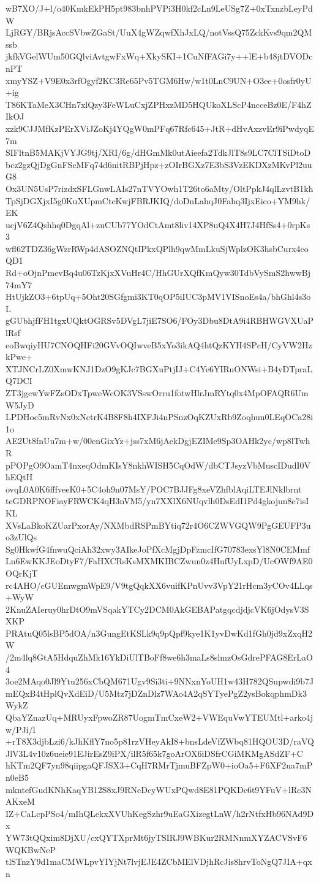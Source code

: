 wB7XO/J+l/o40KmkEkPH5pt983bnhPVPi3H0kf2cLn9LeUSg7Z+0xTxnzbLeyPdW
LjRGY/BRjsAccSVbwZGaSt/UuX4gWZqwfXhJxLQ/notVssQ75ZckKvs9qm2QMssb
jkfkVGelWUm50GQlviAvtgwFxWq+XkySKI+1CuNfFAGi7y++lE+b48jtDVODcnPT
xmyYSZ+V9E0x3rfOgyf2KC3Re65Pv5TGM6Hw/w1t0LnC9UN+O3ee+0osfr0yU+ig
T86KTaMeX3CHn7xlQzy3FeWLuCxjZPHxzMD5HQUkoXLScP4ncceBz0E/F4hZIkOJ
xzk9CJJMfKzPErXViJZoKj4YQgW0mPFq67Rfc645+JtR+dHvAxzvEr9iPwdyqE7m
SIFltnB5MAKjVYJG9tj/XRI/6g/dHGmMk0utAieefa2TdkJlT8s9LC7ClTSiDtoD
bcz2gzQjDgGnFScMFq74d6nitRBPjHpz+zOIrBGXz7E3bS3VzEKDXzMKvPl2uuG8
Ox3UN5UsP7rizdxSFLGnwLAIs27nTVYOwh1T26to6aMty/OltPpkJ4qlLzvtB1kh
TpSjDGXjxI5g0KuXUpmCtcKwjFBRJKIQ/doDnLahqJ0Fahq3IjxEico+YM9hk/EK
ucjV6Z4Qshhq0DgqAl+zuCUb77YOdCtAmt8liv14XP8uQ4X4H7J4HfSs4+0rpKs3
wfl62TDZ36gWzrRWp4dASOZNQtIPkxQPlh9qwMmLkuSjWplzOK3hsbCurx4coQD1
Rd+oOjnPmevBq4u06TzKjxXVuHr4C/HhGUrXQfKmQyw30TdbVySmS2hwwBj74mY7
HtUjkZO3+6tpUq+5Oht20SGfgmi3KT0qOP5iIUC3pMV1VISnoEs4a/bhGhl4s3oL
gGUbhjfFH1tgxUQktOGRSv5DVgL7jiE7SO6/FOy3Dbu8DtA9i4RBHWGVXUaPlRsf
eoBwqiyHU7CNOQHFi20GVvOQIwveB5xYo3ikAQ4htQzKYH4SPcH/CyVW2HzkPwe+
XTJNCrLZ0XmwKNJ1DzO9gKJc7BGXuPtjIJ+C4Ye6YIRuONWsi+B4yDTpraLQ7DCI
ZT3jgcwYwFZsODxTpweWcOK3VSswOrru1fotwHlrJmRYtq0x4MpOFAQR6UmW5JyD
LPDHoc5mRvNx0xNctrK4B8F8h4IXFJi4nPSnzOqKZUxRb9Zoqhun0LEqOCa28i1o
AE2Ut8fnUu7m+w/00enGixYz+jss7xM6jAekDgjEZIMe9Sp3OAHk2yc/wp8lTwhR
pPOPgO9OamT4nxeqOdmKIsY8nkhWISH5CqOdW/dbCTJsyzVbMuscIDudI0VhEQtH
ovqL0A0K6fffveeK0+5C4oh9n07MsY/POC7BJJFg8xeVZhfblAqiLTEJlNklbrnt
teGDRPNOFiayFRWCK4qH3nVM5/yn7XXlX6NUqvlh0DsEdI1Pd4gkojun8e7isIKL
XVsLaBkoKZUarPxorAy/NXMbdRSPmBYtiq72r4O6CZWVGQW9PgGEUFP3uo3zUlQs
Sg0HkwfG4fnwuQciAh32xwy3AIkeJoPfXcMgjDpFzmcIfG70783exsYl8N0CEMmf
Ln6EwKKJEoDtyF7/FaHXCRsKsMXMKIBCZwun0z4HufUyLxpD/UcOWf9AE0OQrKjT
rc4AHO/cGUEmwgmWpE9/V9tgQqkXX6vuifKPnUvv3VpY21rHcm3yCOv4LLqs+WyW
2KnuZAIeruy0hrDtO9mVSqakYTCy2DCM0AkGEBAPatgqcdjdjcVK6jOdysV3SXKP
PRAtuQ05lsBP5dOA/n3GungEtKSLk9q9pQpf9kye1K1yvDwKd1fGh0jd9xZxqH2W
/2m4lq8GtA5HdquZhMk16YkDiUlTBoFf8we6h3maLs8slmzOsGdrePFAG8ErLaO4
3oe2MAqo0Jl9Ytu256xCbQM671Ugv9Si3ti+9NNxnYoUH1w43H782QSupwdi9b7J
mEQxB4tHplQvXdEiD/U5Mtz7jDZnDlz7WAo4A2qSYTyePgZ2ysBokqphmDk3WykZ
QbaYZnazUq+MRUyxFpwoZR87UogmTmCxeW2+VWEquVwYTEUMtl+arko4jw/PJi/l
+rT8X3djbLzi6/kJhKflY7no5p81rzVHeyAkI8+bnsLdeVfZWbq81HQOU3D/raVQ
JlV3L4v10z6ueie91EJirEsZ9iPX/ilR5f65k7goArOX6iDSfrCGiMKMgASdZF+C
hKTm2QF7yn98qiipgaQFJSX3+CqH7RMrTjmuBFZpW0+ioOa5+F6XF2ua7mPn0eB5
mkntefGudKNhKaqYB12S8xJ9RNeDcyWUxPQwd8E81PQKDc6t9YFuV+lRc3NAKxeM
IZ+CaLcpPSo4/mIhQLekxXVUhKegSzhr9uEaGXizegtLnW/h2rNtfxHb96NAd9Dx
YW73tQQxim8DjXU/cxQYTXprMt6jyTSIRJ9WBKur2RMNnmXYZACVSvF6WQKBwNeP
tlSTnzY9d1maCMWLpvYIYjNt7lvjEJE4ZCbMElVDjhRcJis8hrvToNgQ7JIA+qxn
